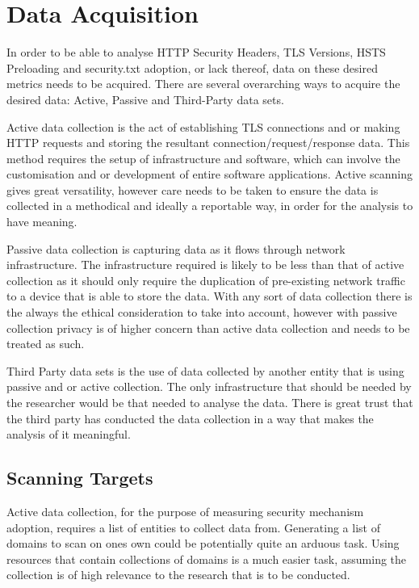 \documentclass{mscreport}
\begin{document}
\section{Data Acquisition}
\label{section:data_aquisition}

In order to be able to analyse HTTP Security Headers, TLS Versions, HSTS Preloading and security.txt adoption, or lack thereof, data on these desired metrics needs to be acquired. There are several overarching ways to acquire the desired data: Active, Passive and Third-Party data sets.

\vspace{0.3cm} \noindent
Active data collection is the act of establishing TLS connections and or making HTTP requests and storing the resultant connection/request/response data. This method requires the setup of infrastructure and software, which can involve the customisation and or development of entire software applications. Active scanning gives great versatility, however care needs to be taken to ensure the data is collected in a methodical and ideally a reportable way, in order for the analysis to have meaning.

\vspace{0.3cm} \noindent
Passive data collection is capturing data as it flows through network infrastructure. The infrastructure required is likely to be less than that of active collection as it should only require the duplication of pre-existing network traffic to a device that is able to store the data. With any sort of data collection there is the always the ethical consideration to take into account, however with passive collection privacy is of higher concern than active data collection and needs to be treated as such.

\vspace{0.3cm} \noindent
Third Party data sets is the use of data collected by another entity that is using passive and or active collection. The only infrastructure that should be needed by the researcher would be that needed to analyse the data. There is great trust that the third party has conducted the data collection in a way that makes the analysis of it meaningful.

\subsection{Scanning Targets}
Active data collection, for the purpose of measuring security mechanism adoption, requires a list of entities to collect data from. Generating a list of domains to scan on ones own could be potentially quite an arduous task. Using resources that contain collections of domains is a much easier task, assuming the collection is of high relevance to the research that is to be conducted.
\end{document}
